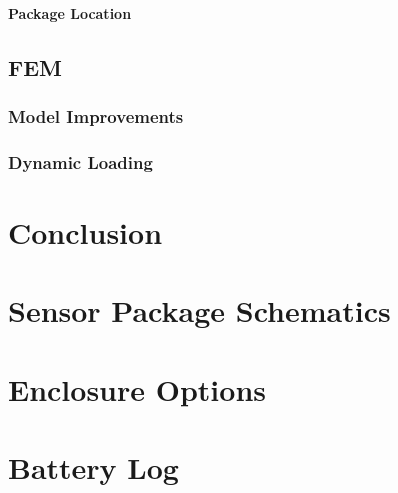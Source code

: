 \documentclass[12pt]{report}
\begin{document}
			\subsubsection{Package Location}
				
	\section{FEM}
		\subsection{Model Improvements}
		\subsection{Dynamic Loading}
\chapter{Conclusion}




\appendix

\chapter{Sensor Package Schematics}
\label{app:Schematic}


\chapter{Enclosure Options}
\label{app:CaseOptions}


\chapter{Battery Log}
\label{app:batterylog}

 
\end{document}
